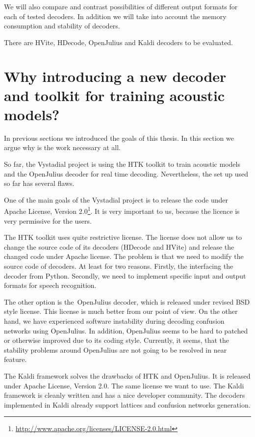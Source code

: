 We will also compare and contrast possibilities of different output formats for each of tested decoders.
In addition we will take into account the memory consumption and stability of decoders.

There are HVite, HDecode, OpenJulius and Kaldi decoders to be evaluated.


    
\section[Why new decoder and toolkit?]{Why introducing a new decoder and toolkit for training acoustic models?} 
\label{sec:why}
In previous sections we introduced the goals of this thesis. In this section we argue why is the work necessary at all.

So far, the Vystadial project is using the HTK toolkit to train acoustic models and the OpenJulius decoder for real time decoding.
Nevertheless, the set up used so far has several flaws.

One of the main goals of the Vystadial project is to release the code under Apache License, Version 2.0\footnote{\url{http://www.apache.org/licenses/LICENSE-2.0.html}}. It is very important to us, because the licence is very permissive for the users. 

The HTK toolkit uses quite restrictive license. The license does not allow us to change the source code of its decoders (HDecode and HVite) and release the changed code under Apache license. The problem is that we need to modify the source code of decoders. At least for two reasons. Firstly, the interfacing the decoder from Python. Secondly, we need to implement specific input and output formats for speech recognition.

The other option is the~OpenJulius decoder, which is released under revised BSD style license. This license is much better from our point of view. On the other hand, we have experienced software instability during decoding confusion networks using OpenJulius. In addition, OpenJulius seems to be hard to patched or otherwise improved due to its coding style. Currently, it seems, that the stability problems around OpenJulius are not going to be resolved in near feature.

The Kaldi framework solves the drawbacks of HTK and OpenJulius. It is released under Apache License, Version 2.0. The same license we want to use. The Kaldi framework is cleanly written and has a nice developer community.
The decoders implemented in Kaldi already support lattices and confusion networks generation. 

